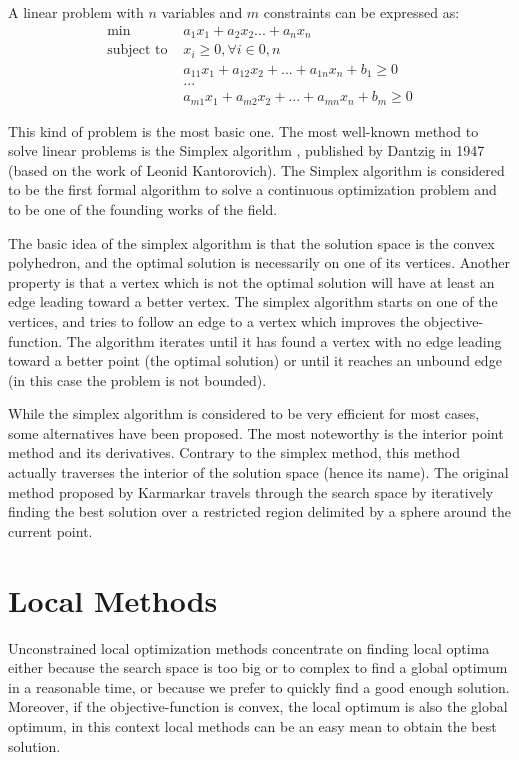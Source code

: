 A linear problem with $n$ variables and $m$ constraints can be expressed as:
\begin{align*}
\text{min } & a_1x_1 + a_2x_2... + a_nx_n\\
\text{subject to } &x_i \geq 0, \forall i \in 0,n\\
&a_{11}x_1 + a_{12}x_2 + ... + a_{1n}x_n + b_1 \geq 0\\
&...\\
&a_{m1}x_1 + a_{m2}x_2 + ... + a_{mn}x_n + b_m \geq 0
\end{align*}

This kind of problem is the most basic one. The most well-known method to solve linear problems is the Simplex algorithm \cite{dantzig1998linear}, published by Dantzig in 1947 (based on the work of Leonid Kantorovich). The Simplex algorithm is considered to be the first formal algorithm to solve a continuous optimization problem and to be one of the founding works of the field.

The basic idea of the simplex algorithm is that the solution space is the convex polyhedron, and the optimal solution is necessarily on one of its vertices. Another property is that a vertex which is not the optimal solution will have at least an edge leading toward a better vertex.
The simplex algorithm starts on one of the vertices, and tries to follow an edge to a vertex which improves the objective-function. The algorithm iterates until it has found a vertex with no edge leading toward a better point (the optimal solution) or until it reaches an unbound edge (in this case the problem is not bounded).

While the simplex algorithm is considered to be very efficient for most cases, some alternatives have been proposed. The most noteworthy is the interior point method and its derivatives. Contrary to the simplex method, this method actually traverses the interior of the solution space (hence its name). The original method proposed by Karmarkar \cite{Karmarkar:1984:NPA:800057.808695} travels through the search space by iteratively finding the best solution over a restricted region delimited by a sphere around the current point.

\section{Local Methods}

Unconstrained local optimization methods concentrate on finding local optima either because the search space is too big or to complex to find a global optimum in a reasonable time, or because we prefer to quickly find a good enough solution.
 Moreover, if the objective-function is convex, the local optimum is also the global optimum, in this context local methods can be an easy mean to obtain the best solution.

